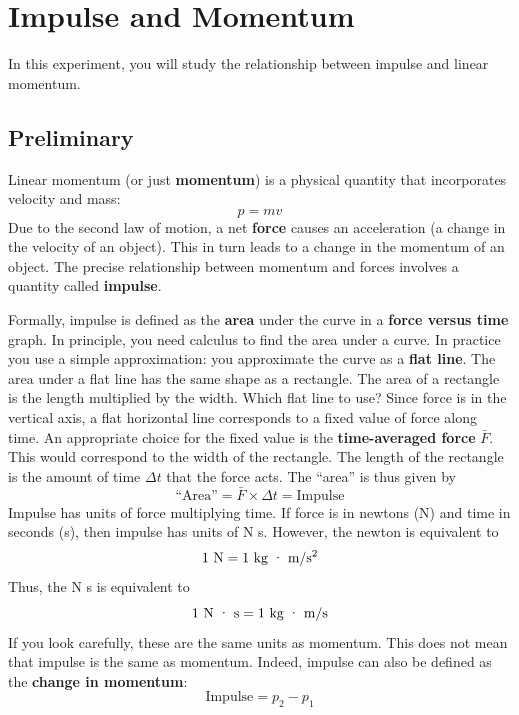 \setcounter{chapter}{6}
\chapter{Impulse and Momentum}
%
In this experiment, you will study the relationship between impulse and linear momentum.
%
\section{Preliminary}
%
Linear momentum (or just \textbf{momentum}) is a physical quantity that incorporates velocity and mass:
\begin{equation}
    p = m v
\end{equation}
Due to the second law of motion, a net \textbf{force} causes an acceleration (a change in the velocity of an object). This in turn leads to a change in the momentum of an object. The precise relationship between momentum and forces involves a quantity called \textbf{impulse}.

Formally, impulse is defined as the \textbf{area} under the curve in a \textbf{force versus time} graph. In principle, you need calculus to find the area under a curve. In practice you use a simple approximation: you approximate the curve as a \textbf{flat line}. The area under a flat line has the same shape as a rectangle. The area of a rectangle is the length multiplied by the width. Which flat line to use? Since force is in the vertical axis, a flat horizontal line corresponds to a fixed value of force along time. An appropriate choice for the fixed value is the \textbf{time-averaged force} $\bar{F}$. This would correspond to the width of the rectangle. The length of the rectangle is the amount of time $\Delta t$ that the force acts. The ``area'' is thus given by
\begin{equation}
    \text{``Area''} = \bar{F} \times \Delta t = \text{Impulse}
\end{equation}
Impulse has units of force multiplying time. If force is in newtons (N) and time in seconds (s), then impulse has units of N {\textperiodcentered} s. However, the newton is equivalent to
\begin{equation}
    1 \ \text{N} = 1 \ \text{kg {\textperiodcentered} m/s\textsuperscript{2}}
\end{equation}
Thus, the N {\textperiodcentered} s is equivalent to
\begin{equation}
    1 \ \text{N {\textperiodcentered} s} = 1 \ \text{kg {\textperiodcentered} m/s}
\end{equation}
If you look carefully, these are the same units as momentum. This does not mean that impulse is the same as momentum. Indeed, impulse can also be defined as the \textbf{change in momentum}:
\begin{equation}
    \text{Impulse} = p_{2} - p_{1}
\end{equation}
%
